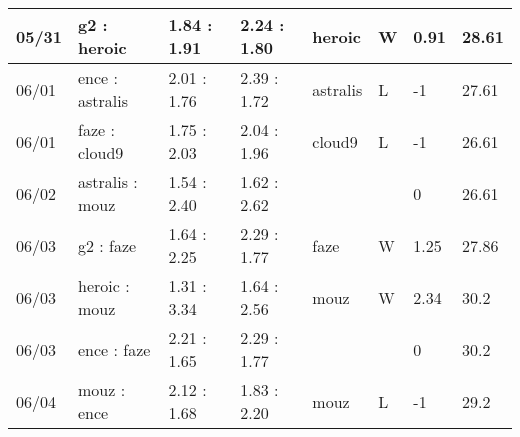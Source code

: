 \begin{small}
\begin{longtable}{|l|l|l|l|l|l|l|l|}
	05/31                               & g2 : heroic                         & 1.84 : 1.91                             & 2.24 : 1.80                             & heroic                            & W                                 & 0.91                                 & 28.61                             \\ \hline
	06/01                               & ence : astralis                     & 2.01 : 1.76                             & 2.39 : 1.72                             & astralis                          & L                                 & -1                                   & 27.61                             \\ \hline
	06/01                               & faze : cloud9                       & 1.75 : 2.03                             & 2.04 : 1.96                             & cloud9                            & L                                 & -1                                   & 26.61                             \\ \hline
	06/02                               & astralis : mouz                     & 1.54 : 2.40                             & 1.62 : 2.62                             &                                   &                                   & 0                                    & 26.61                             \\ \hline
	06/03                               & g2 : faze                           & 1.64 : 2.25                             & 2.29 : 1.77                             & faze                              & W                                 & 1.25                                 & 27.86                             \\ \hline
	06/03                               & heroic : mouz                       & 1.31 : 3.34                             & 1.64 : 2.56                             & mouz                              & W                                 & 2.34                                 & 30.2                              \\ \hline
	06/03                               & ence : faze                         & 2.21 : 1.65                             & 2.29 : 1.77                             &                                   &                                   & 0                                    & 30.2                              \\ \hline
	06/04                               & mouz : ence                         & 2.12 : 1.68                             & 1.83 : 2.20                             & mouz                              & L                                 & -1                                   & 29.2                              \\ \hline

\end{longtable}
\end{small}
